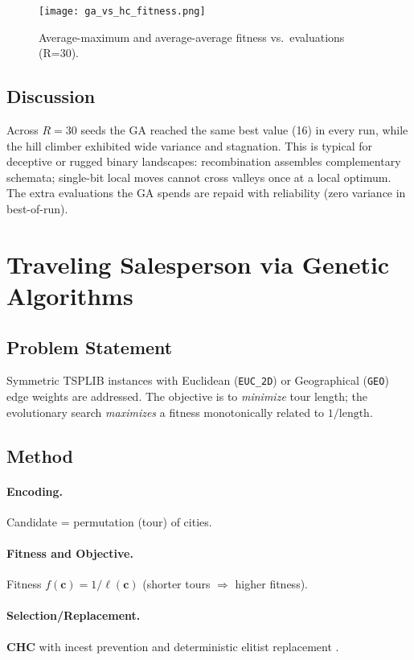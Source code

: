 \documentclass{article}
\begin{document}
\begin{figure}[H]
    \centering
    \texttt{[image: ga\_vs\_hc\_fitness.png]}
    \caption{Average-maximum and average-average fitness vs.\ evaluations (R=30).}
\end{figure}

\subsection{Discussion}
Across $R{=}30$ seeds the GA reached the same best value (16) in every run, while the hill climber exhibited wide variance and stagnation. This is typical for deceptive or rugged binary landscapes: recombination assembles complementary schemata; single-bit local moves cannot cross valleys once at a local optimum. The extra evaluations the GA spends are repaid with reliability (zero variance in best-of-run).

\section{Traveling Salesperson via Genetic Algorithms}
\subsection{Problem Statement}
Symmetric TSPLIB instances with Euclidean (\texttt{EUC\_2D}) or Geographical (\texttt{GEO}) edge weights are addressed. The objective is to \emph{minimize} tour length; the evolutionary search \emph{maximizes} a fitness monotonically related to $1/\text{length}$.

\subsection{Method}
\paragraph{Encoding.} Candidate = permutation (tour) of cities.
\paragraph{Fitness and Objective.} Fitness $f(\mathbf{c}) = 1/\ell(\mathbf{c})$ (shorter tours $\Rightarrow$ higher fitness).
\paragraph{Selection/Replacement.} \textbf{CHC} with incest prevention and deterministic elitist replacement \cite{eshelman1991chc}.
\end{document}
